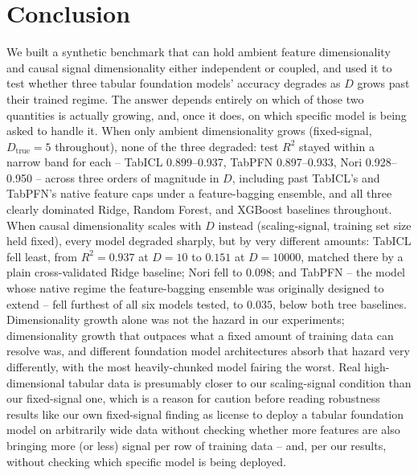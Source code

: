 \documentclass{article}
\begin{document}
\section{Conclusion}
\label{sec:conclusion}

We built a synthetic benchmark that can hold ambient feature dimensionality and
causal signal dimensionality either independent or coupled, and used it to test
whether three tabular foundation models' accuracy degrades as $D$ grows past their
trained regime. The answer depends entirely on which of those two quantities is
actually growing, and, once it does, on which specific model is being asked to
handle it. When only ambient dimensionality grows (fixed-signal, $D_{\text{true}}=5$
throughout), none of the three degraded: test $R^2$ stayed within a narrow band for
each -- TabICL 0.899--0.937, TabPFN 0.897--0.933, Nori 0.928--0.950 -- across three
orders of magnitude in $D$, including past TabICL's and TabPFN's native feature caps
under a feature-bagging ensemble, and all three clearly dominated Ridge, Random
Forest, and XGBoost baselines throughout. When causal dimensionality scales with $D$
instead (scaling-signal, training set size held fixed), every model degraded
sharply, but by very different amounts: TabICL fell least, from $R^2=0.937$ at
$D=10$ to $0.151$ at $D=10000$, matched there by a plain cross-validated Ridge
baseline; Nori fell to $0.098$; and TabPFN -- the model whose native regime the
feature-bagging ensemble was originally designed to extend -- fell furthest of all
six models tested, to $0.035$, below both tree baselines. Dimensionality growth
alone was not the hazard in our experiments; dimensionality growth that outpaces
what a fixed amount of training data can resolve was, and different foundation model
architectures absorb that hazard very differently, with the most heavily-chunked
model fairing the worst. Real high-dimensional tabular data is presumably closer to
our scaling-signal condition than our fixed-signal one, which is a reason for caution
before reading robustness results like our own fixed-signal finding as license to
deploy a tabular foundation model on arbitrarily wide data without checking whether
more features are also bringing more (or less) signal per row of training data --
and, per our results, without checking which specific model is being deployed.
\end{document}
